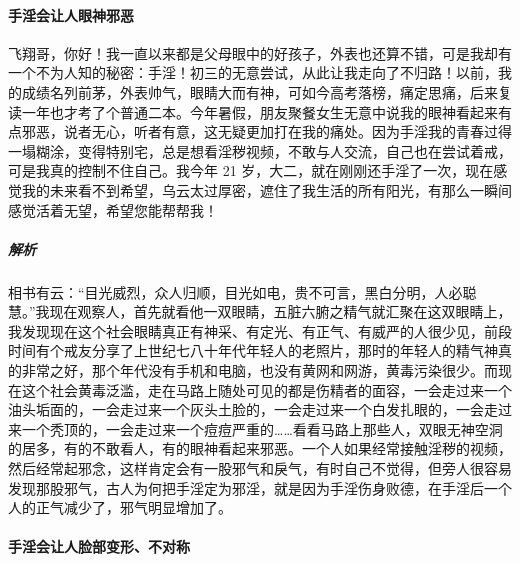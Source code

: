 \paragraph{手淫会让人眼神邪恶}

\begin{case}
    飞翔哥，你好！我一直以来都是父母眼中的好孩子，外表也还算不错，可是我却有一个不为人知的秘密：手淫！初三的无意尝试，从此让我走向了不归路！以前，我的成绩名列前茅，外表帅气，眼睛大而有神，可如今高考落榜，痛定思痛，后来复读一年也才考了个普通二本。今年暑假，朋友聚餐女生无意中说我的眼神看起来有点邪恶，说者无心，听者有意，这无疑更加打在我的痛处。因为手淫我的青春过得一塌糊涂，变得特别宅，总是想看淫秽视频，不敢与人交流，自己也在尝试着戒，可是我真的控制不住自己。我今年 21 岁，大二，就在刚刚还手淫了一次，现在感觉我的未来看不到希望，乌云太过厚密，遮住了我生活的所有阳光，有那么一瞬间感觉活着无望，希望您能帮帮我！
    \subparagraph{解析} 相书有云：“目光威烈，众人归顺，目光如电，贵不可言，黑白分明，人必聪慧。”我现在观察人，首先就看他一双眼睛，五脏六腑之精气就汇聚在这双眼睛上，我发现现在这个社会眼睛真正有神采、有定光、有正气、有威严的人很少见，前段时间有个戒友分享了上世纪七八十年代年轻人的老照片，那时的年轻人的精气神真的非常之好，那个年代没有手机和电脑，也没有黄网和网游，黄毒污染很少。而现在这个社会黄毒泛滥，走在马路上随处可见的都是伤精者的面容，一会走过来一个油头垢面的，一会走过来一个灰头土脸的，一会走过来一个白发扎眼的，一会走过来一个秃顶的，一会走过来一个痘痘严重的……看看马路上那些人，双眼无神空洞的居多，有的不敢看人，有的眼神看起来邪恶。一个人如果经常接触淫秽的视频，然后经常起邪念，这样肯定会有一股邪气和戾气，有时自己不觉得，但旁人很容易发现那股邪气，古人为何把手淫定为邪淫，就是因为手淫伤身败德，在手淫后一个人的正气减少了，邪气明显增加了。
\end{case}

\paragraph{手淫会让人脸部变形、不对称}

